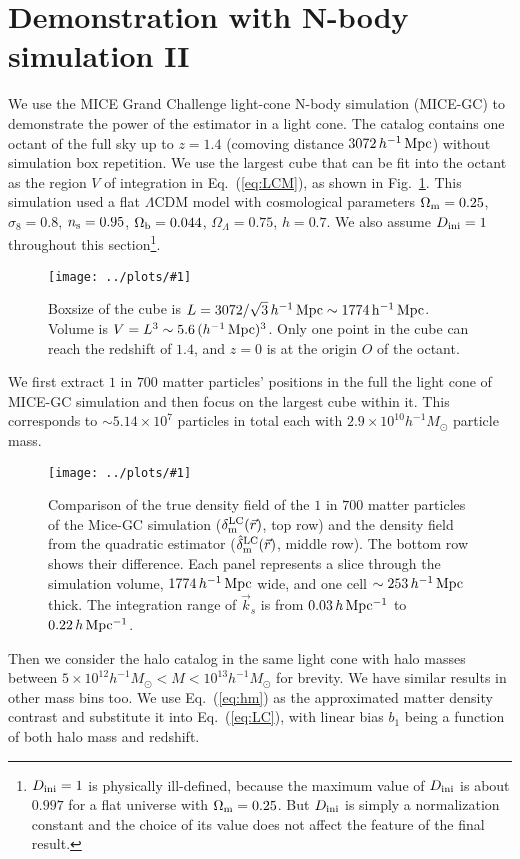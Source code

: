 \documentclass[prd,amsmath,amssymb,floatfix,superscriptaddress,nofootinbib,twocolumn]{revtex4-1}
\newcommand{\ini}{\rm ini}
\newcommand{\vrr}{\vec{r}}
\newcommand{\vk}{\vec{k}}
\newcommand{\ec}[1]{Eq.~(\ref{eq:#1})}
\newcommand{\rf}[1]{\ref{fig:#1}}
\newcommand{\sfig}[2]{
\texttt{[image: ../plots/\#1]}
        }
\newcommand{\Sfig}[2]{
   \begin{figure}[thbp]
   \begin{center}
    \sfig{../plots/#1.pdf}{\columnwidth}
    \caption{{\small #2}}
    \label{fig:#1}
     \end{center}
   \end{figure}
}
\begin{document}
\section{Demonstration with N-body simulation II} \label{sec6}
\noindent We use the MICE Grand Challenge light-cone N-body simulation (MICE-GC) to demonstrate the power of the estimator in a light cone. The catalog contains one octant of the full sky up to $z = 1.4$ (comoving distance $3072\, h^{-1}\, \rm Mpc$) without simulation box repetition. We use the largest cube that can be fit into the octant as the region $V$ of integration in \ec{LCM}, as shown in Fig.~\rf{Cube}. This simulation used a flat $\Lambda$CDM model with cosmological parameters $ \Omega_{\rm m}=0.25$, $\sigma_8 = 0.8$, $n_{\rm s}=0.95$, $\Omega_{\rm b}=0.044$, $\Omega_{\Lambda}=0.75$, $h=0.7$. We also assume $D_{\ini}=1$ throughout this section\footnote{$D_{\rm ini}=1$ is physically ill-defined, because the maximum value of $D_{\rm ini}$ is about $0.997$ for a flat universe with $\Omega_{\rm m}=0.25$. But $D_{\rm ini}$ is simply a normalization constant and the choice of its value does not affect the feature of the final result.}.

\Sfig{Cube}{Boxsize of the cube is $L=3072/\sqrt{3}\, h^{-1}\, \rm Mpc\sim 1774\, h^{-1}\, \rm Mpc$. Volume is $V=L^3\sim 5.6\,(h^{-1}\,\rm Mpc)^3$. Only one point in the cube can reach the redshift of $1.4$, and $z=0$ is at the origin $O$ of the octant.}

We first extract $1$ in $700$  matter particles' positions in the full the light cone of MICE-GC simulation and then focus on the largest cube within it. This corresponds to $\sim 5.14\times 10^{7}$ particles in total each with $2.9\times 10^{10} h^{-1}M_{\odot}$ particle mass. 

\Sfig{real_dm}{Comparison of the true density field of the $1$ in $700$ matter particles of the Mice-GC simulation ($\delta^{\rm LC}_{\rm m}(\vrr)$, top row) and the density field from the quadratic estimator ($\hat{\delta}_{\rm m}^{\rm LC}(\vrr)$, middle row). The bottom row shows their difference. Each panel represents a slice through the simulation volume, $1774\,h^{-1}\rm \, Mpc$ wide, and one cell $\sim 253\,h^{-1}\rm \, Mpc$ thick. The integration range of $\vk_{s}$ is from $0.03\, h \rm \, Mpc^{-1}$ to $0.22\, h \rm \, Mpc^{-1}$.}

Then we consider the halo catalog in the same light cone with halo masses between $5 \times 10^{12}h^{-1}M_{\odot}<M < 10^{13}h^{-1}M_{\odot}$ for brevity. We have similar results in other mass bins too. We use \ec{hm} as the approximated matter density contrast and substitute it into \ec{LC}, with linear bias $b_{1}$ being a function of both halo mass and redshift. 
\end{document}
